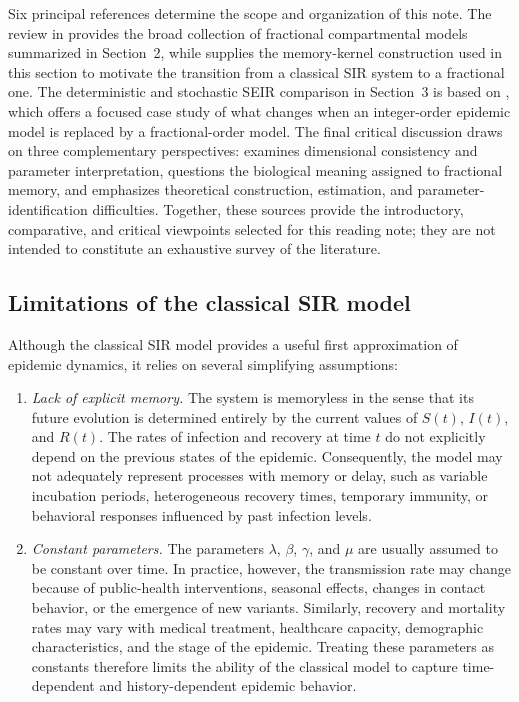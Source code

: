 \documentclass[00-main.tex]{subfiles}
\begin{document}
Six principal references determine the scope and organization of this note.
The review in \cite{Ch21} provides the broad collection of fractional compartmental models summarized in Section~2, while \cite{Sa17} supplies the memory-kernel construction used in this section to motivate the transition from a classical SIR system to a fractional one.
The deterministic and stochastic SEIR comparison in Section~3 is based on \cite{Is20}, which offers a focused case study of what changes when an integer-order epidemic model is replaced by a fractional-order model.
The final critical discussion draws on three complementary perspectives: \cite{Gh25} examines dimensional consistency and parameter interpretation, \cite{Cu26} questions the biological meaning assigned to fractional memory, and \cite{Ci26} emphasizes theoretical construction, estimation, and parameter-identification difficulties.
Together, these sources provide the introductory, comparative, and critical viewpoints selected for this reading note; they are not intended to constitute an exhaustive survey of the literature.


\subsection{Limitations of the classical SIR model}

Although the classical SIR model provides a useful first approximation of epidemic dynamics, it relies on several simplifying assumptions:
\begin{enumerate}
	\item \textit{Lack of explicit memory.}
	The system is memoryless in the sense that its future evolution is determined entirely by the current values of $S(t)$, $I(t)$, and $R(t)$.
	The rates of infection and recovery at time $t$ do not explicitly depend on the previous states of the epidemic.
	Consequently, the model may not adequately represent processes with memory or delay, such as variable incubation periods, heterogeneous recovery times, temporary immunity, or behavioral responses influenced by past infection levels.

	\item \textit{Constant parameters.}
	The parameters $\lambda$, $\beta$, $\gamma$, and $\mu$ are usually assumed to be constant over time.
	In practice, however, the transmission rate may change because of public-health interventions, seasonal effects, changes in contact behavior, or the emergence of new variants.
	Similarly, recovery and mortality rates may vary with medical treatment, healthcare capacity, demographic characteristics, and the stage of the epidemic.
	Treating these parameters as constants therefore limits the ability of the classical model to capture time-dependent and history-dependent epidemic behavior.
\end{enumerate}
\end{document}
